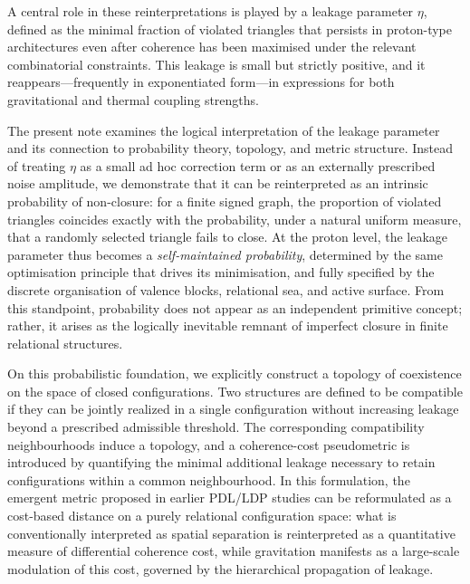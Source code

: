 \documentclass[11pt,a4paper]{article}
\theoremstyle{definition}
\newcommand{\etaL}{\eta} %
\begin{document}
A central role in these reinterpretations is played by a leakage parameter \(\etaL\), defined as the minimal fraction of violated triangles that persists in proton-type architectures even after coherence has been maximised under the relevant combinatorial constraints. This leakage is small but strictly positive, and it reappears—frequently in exponentiated form—in expressions for both gravitational and thermal coupling strengths.

The present note examines the logical interpretation of the leakage parameter and its connection to probability theory, topology, and metric structure. Instead of treating \(\etaL\) as a small ad hoc correction term or as an externally prescribed noise amplitude, we demonstrate that it can be reinterpreted as an intrinsic probability of non-closure: for a finite signed graph, the proportion of violated triangles coincides exactly with the probability, under a natural uniform measure, that a randomly selected triangle fails to close. At the proton level, the leakage parameter thus becomes a \emph{self-maintained probability}, determined by the same optimisation principle that drives its minimisation, and fully specified by the discrete organisation of valence blocks, relational sea, and active surface. From this standpoint, probability does not appear as an independent primitive concept; rather, it arises as the logically inevitable remnant of imperfect closure in finite relational structures.

On this probabilistic foundation, we explicitly construct a topology of coexistence on the space of closed configurations. Two structures are defined to be compatible if they can be jointly realized in a single configuration without increasing leakage beyond a prescribed admissible threshold. The corresponding compatibility neighbourhoods induce a topology, and a coherence-cost pseudometric is introduced by quantifying the minimal additional leakage necessary to retain configurations within a common neighbourhood. In this formulation, the emergent metric proposed in earlier PDL/LDP studies can be reformulated as a cost-based distance on a purely relational configuration space: what is conventionally interpreted as spatial separation is reinterpreted as a quantitative measure of differential coherence cost, while gravitation manifests as a large-scale modulation of this cost, governed by the hierarchical propagation of leakage.
\end{document}
